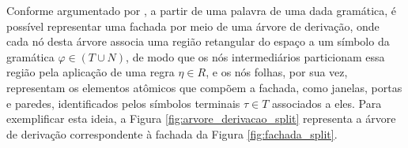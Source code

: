 \begin{figure}[h!]
	\centering
	\captionsetup{width=15cm}
	{}	
\end{figure}

\begin{figure}[h!]
	\centering
	\captionsetup{width=15cm}
	{}	
\end{figure}

Conforme argumentado por , a partir de uma palavra de uma dada gramática, é possível representar uma fachada por meio de uma árvore de derivação, onde cada nó desta árvore associa uma região retangular do espaço a um símbolo da gramática $\varphi \in (T \cup N)$, de modo que os nós intermediários particionam essa região pela aplicação de uma regra $\eta \in R$, e os nós folhas, por sua vez, representam os elementos atômicos que compõem a fachada, como janelas, portas e paredes, identificados pelos símbolos terminais $\tau \in T$ associados a eles. Para exemplificar esta ideia, a Figura \ref{fig:arvore_derivacao_split} representa a árvore de derivação correspondente à fachada da Figura \ref{fig:fachada_split}.

